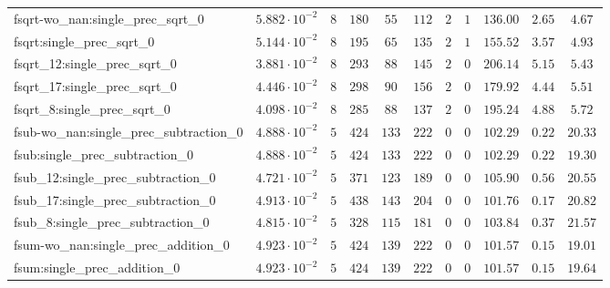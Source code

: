 \begin{tabular}{|l|c|c|c|c|c|c|c|c|c|c|}
fsqrt-wo\_nan:single\_prec\_sqrt\_0            & $ 5.882 \cdot 10^{-2} $ & $ 8      $ & $ 180    $ & $ 55    $ & $ 112   $ & $ 2   $ & $ 1 $ & $ 136.00      $ & $ 2.65    $ & $ 4.67    $ \\
fsqrt:single\_prec\_sqrt\_0                    & $ 5.144 \cdot 10^{-2} $ & $ 8      $ & $ 195    $ & $ 65    $ & $ 135   $ & $ 2   $ & $ 1 $ & $ 155.52      $ & $ 3.57    $ & $ 4.93    $ \\
fsqrt\_12:single\_prec\_sqrt\_0                & $ 3.881 \cdot 10^{-2} $ & $ 8      $ & $ 293    $ & $ 88    $ & $ 145   $ & $ 2   $ & $ 0 $ & $ 206.14      $ & $ 5.15    $ & $ 5.43    $ \\
fsqrt\_17:single\_prec\_sqrt\_0                & $ 4.446 \cdot 10^{-2} $ & $ 8      $ & $ 298    $ & $ 90    $ & $ 156   $ & $ 2   $ & $ 0 $ & $ 179.92      $ & $ 4.44    $ & $ 5.51    $ \\
fsqrt\_8:single\_prec\_sqrt\_0                 & $ 4.098 \cdot 10^{-2} $ & $ 8      $ & $ 285    $ & $ 88    $ & $ 137   $ & $ 2   $ & $ 0 $ & $ 195.24      $ & $ 4.88    $ & $ 5.72    $ \\
fsub-wo\_nan:single\_prec\_subtraction\_0      & $ 4.888 \cdot 10^{-2} $ & $ 5      $ & $ 424    $ & $ 133   $ & $ 222   $ & $ 0   $ & $ 0 $ & $ 102.29      $ & $ 0.22    $ & $ 20.33   $ \\
fsub:single\_prec\_subtraction\_0              & $ 4.888 \cdot 10^{-2} $ & $ 5      $ & $ 424    $ & $ 133   $ & $ 222   $ & $ 0   $ & $ 0 $ & $ 102.29      $ & $ 0.22    $ & $ 19.30   $ \\
fsub\_12:single\_prec\_subtraction\_0          & $ 4.721 \cdot 10^{-2} $ & $ 5      $ & $ 371    $ & $ 123   $ & $ 189   $ & $ 0   $ & $ 0 $ & $ 105.90      $ & $ 0.56    $ & $ 20.55   $ \\
fsub\_17:single\_prec\_subtraction\_0          & $ 4.913 \cdot 10^{-2} $ & $ 5      $ & $ 438    $ & $ 143   $ & $ 204   $ & $ 0   $ & $ 0 $ & $ 101.76      $ & $ 0.17    $ & $ 20.82   $ \\
fsub\_8:single\_prec\_subtraction\_0           & $ 4.815 \cdot 10^{-2} $ & $ 5      $ & $ 328    $ & $ 115   $ & $ 181   $ & $ 0   $ & $ 0 $ & $ 103.84      $ & $ 0.37    $ & $ 21.57   $ \\
fsum-wo\_nan:single\_prec\_addition\_0         & $ 4.923 \cdot 10^{-2} $ & $ 5      $ & $ 424    $ & $ 139   $ & $ 222   $ & $ 0   $ & $ 0 $ & $ 101.57      $ & $ 0.15    $ & $ 19.01   $ \\
fsum:single\_prec\_addition\_0                 & $ 4.923 \cdot 10^{-2} $ & $ 5      $ & $ 424    $ & $ 139   $ & $ 222   $ & $ 0   $ & $ 0 $ & $ 101.57      $ & $ 0.15    $ & $ 19.64   $ \\

\end{tabular}
